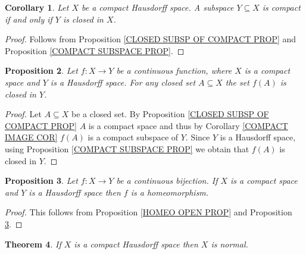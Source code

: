 \documentclass[11pt, letterpaper, oneside]{report}
\theoremstyle{pplain}
\newtheorem{theorem}{Theorem}[chapter]
\newtheorem{proposition}[theorem]{Proposition}
\newtheorem{corollary}[theorem]{Corollary}
\newtheorem{ITERMVALUE THM}[theorem]{Intermediate Value Theorem}
\newtheorem{HEINEBOREL THM}[theorem]{Heine-Borel Theorem}
\newtheorem{UMETR THM}[theorem]{Urysohn Metrization Theorem}
\newtheorem{UMETR2 THM}[theorem]{Urysohn Metrization Theorem (v.2)}
\theoremstyle{ddefinition}
\theoremstyle{nnn}
\newtheorem{TDA NN}[theorem]{Topological Data Analysis. }
\theoremstyle{eexercise}
\begin{document}
\begin{corollary}
Let $X$ be a  compact Hausdorff space. A subspace  
$Y\subseteq X$ is compact if and only if   $Y$ is closed in $X$. 
\end{corollary}

\begin{proof}
Follows from Proposition \ref{CLOSED SUBSP OF COMPACT PROP} and 
Proposition \ref{COMPACT SUBSPACE PROP}.
\end{proof}


\begin{proposition}
\label{COMPACT TO HAUSDORFF CLOSED MAP PROP}
Let $f\colon X\to Y$ be a continuous function, where $X$ is a compact space and $Y$ is a Hausdorff space. 
For any closed set $A\subseteq X$ the set $f(A)$ is closed in $Y$.  
\end{proposition}

\begin{proof}
Let $A\subseteq X$ be a closed set. By Proposition \ref{CLOSED SUBSP OF COMPACT PROP}
$A$ is  a compact space and thus by Corollary  \ref{COMPACT IMAGE COR}  $f(A)$ is  a 
compact   subspace of $Y$. Since $Y$ is a Hausdorff space, 
using Proposition \ref{COMPACT SUBSPACE PROP} we obtain that $f(A)$ is closed in $Y$. 
\end{proof}

\begin{proposition}
\label{COMPACT TO HAUSDORF BIJ PROP}
Let $f\colon X\to Y$ be a continuous bijection. If $X$ is a compact space and $Y$ is a Hausdorff 
space then $f$ is a homeomorphism. 
\end{proposition}

\begin{proof}
This follows from  Proposition \ref{HOMEO OPEN PROP} and Proposition \ref{COMPACT TO HAUSDORF BIJ PROP}. 
\end{proof}


\begin{theorem}
\label{COMPACT IS NORMAL THM}
If $X$ is a  compact Hausdorff space then $X$ is normal.  
\end{theorem}
\end{document}
